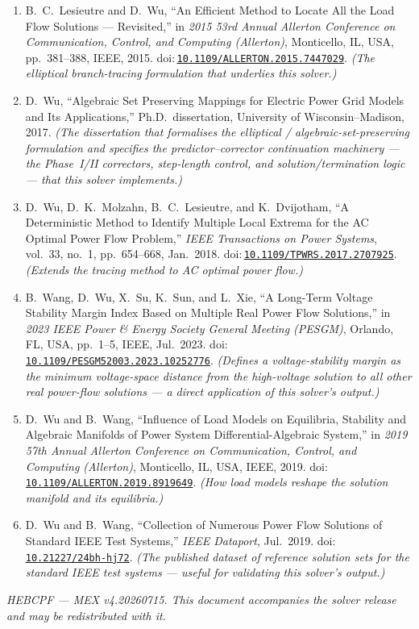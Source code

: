 \documentclass[11pt,a4paper]{article}
\newcommand{\doi}[1]{\href{https://doi.org/#1}{\nolinkurl{#1}}}
\begin{document}
\begin{enumerate}[leftmargin=1.6em]
\item B.\ C.\ Lesieutre and D.\ Wu, ``An Efficient Method to Locate All the Load Flow
      Solutions --- Revisited,'' in \emph{2015 53rd Annual Allerton Conference on
      Communication, Control, and Computing (Allerton)}, Monticello, IL, USA, pp.~381--388,
      IEEE, 2015. doi:\,\doi{10.1109/ALLERTON.2015.7447029}. \emph{(The elliptical
      branch-tracing formulation that underlies this solver.)}
\item D.\ Wu, ``Algebraic Set Preserving Mappings for Electric Power Grid Models and Its
      Applications,'' Ph.D.\ dissertation, University of Wisconsin--Madison, 2017.
      \emph{(The dissertation that formalises the elliptical / algebraic-set-preserving
      formulation and specifies the predictor--corrector continuation machinery --- the
      Phase~I/II correctors, step-length control, and solution/termination logic --- that
      this solver implements.)}
\item D.\ Wu, D.\ K.\ Molzahn, B.\ C.\ Lesieutre, and K.\ Dvijotham, ``A Deterministic
      Method to Identify Multiple Local Extrema for the AC Optimal Power Flow Problem,''
      \emph{IEEE Transactions on Power Systems}, vol.~33, no.~1, pp.~654--668, Jan.\ 2018.
      doi:\,\doi{10.1109/TPWRS.2017.2707925}.
      \emph{(Extends the tracing method to AC optimal power flow.)}
\item B.\ Wang, D.\ Wu, X.\ Su, K.\ Sun, and L.\ Xie, ``A Long-Term Voltage Stability
      Margin Index Based on Multiple Real Power Flow Solutions,'' in \emph{2023 IEEE Power
      \& Energy Society General Meeting (PESGM)}, Orlando, FL, USA, pp.~1--5, IEEE,
      Jul.\ 2023. doi:\,\doi{10.1109/PESGM52003.2023.10252776}.
      \emph{(Defines a voltage-stability margin as the
      minimum voltage-space distance from the high-voltage solution to all other real
      power-flow solutions --- a direct application of this solver's output.)}
\item D.\ Wu and B.\ Wang, ``Influence of Load Models on Equilibria, Stability and
      Algebraic Manifolds of Power System Differential-Algebraic System,'' in \emph{2019
      57th Annual Allerton Conference on Communication, Control, and Computing
      (Allerton)}, Monticello, IL, USA, IEEE, 2019.
      doi:\,\doi{10.1109/ALLERTON.2019.8919649}. \emph{(How load models reshape the
      solution manifold and its equilibria.)}
\item D.\ Wu and B.\ Wang, ``Collection of Numerous Power Flow Solutions of Standard IEEE
      Test Systems,'' \emph{IEEE Dataport}, Jul.\ 2019.
      doi:\,\doi{10.21227/24bh-hj72}. \emph{(The published dataset of reference solution
      sets for the standard IEEE test systems --- useful for validating this solver's
      output.)}
\end{enumerate}

\vfill
\begin{center}\small\itshape
HEBCPF --- MEX v4.20260715. This document accompanies the solver release and may be
redistributed with it.
\end{center}
\end{document}
